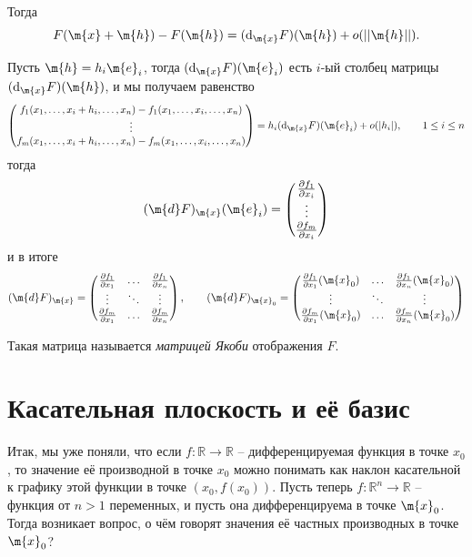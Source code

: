 Тогда 
\[
 F(\m{x} + \m{h}) - F(\m{h}) = (\mathrm{d}_\m{x}F)(\m{h}) + o(||\m{h}||).
\]

Пусть $\m{h} = h_i \m{e}_i$, тогда $(\mathrm{d}_\m{x}F)(\m{e}_i)$ есть $i$-ый столбец матрицы $(\mathrm{d}_\m{x}F)(\m{h})$, и мы получаем равенство
\[
 \begin{pmatrix}
     f_1(x_1, \ldots, x_i + h_i, \ldots, x_n) -f_1(x_1, \ldots, x_i, \ldots, x_n) \\
     \vdots \\
     f_m(x_1, \ldots, x_i + h_i, \ldots, x_n) -f_m(x_1, \ldots, x_i, \ldots, x_n)
 \end{pmatrix} = h_i(\mathrm{d}_\m{x}F)(\m{e}_i) + o(|h_i|), \qquad 1 \le i \le n
\]
тогда
\[
 (\m{d}F)_\m{x}(\m{e}_i) = \begin{pmatrix}
     \frac{\partial f_1}{\partial x_i} \\ \vdots \\ \frac{\partial f_m}{\partial x_i}
 \end{pmatrix}
\]
и в итоге
\[
 (\m{d}F)_\m{x} = \begin{pmatrix}
     \frac{\partial f_1}{\partial x_1} & \ldots & \frac{\partial f_1}{\partial x_n} \\
     \vdots & \ddots & \vdots \\
     \frac{\partial f_m}{\partial x_1} & \ldots & \frac{\partial f_m}{\partial x_n}
 \end{pmatrix}, \qquad 
 (\m{d}F)_{\m{x}_0} = \begin{pmatrix}
     \frac{\partial f_1}{\partial x_1}({\m{x}_0}) & \ldots & \frac{\partial f_1}{\partial x_n} ({\m{x}_0}) \\
     \vdots & \ddots & \vdots \\
     \frac{\partial f_m}{\partial x_1} ({\m{x}_0}) & \ldots & \frac{\partial f_m}{\partial x_n} ({\m{x}_0})
     \end{pmatrix}
    \]

Такая матрица называется \textit{матрицей Якоби} отображения $F.$


\section{Касательная плоскость и её базис}

Итак, мы уже поняли, что если $f:\mathbb{R} \to \mathbb{R}$ -- дифференцируемая функция в точке $x_0$, то значение её производной в точке $x_0$ можно понимать как наклон касательной к графику этой функции в точке $(x_0, f(x_0))$. Пусть теперь $f:\mathbb{R}^n \to \mathbb{R}$ -- функция от $n>1$ переменных, и пусть она дифференцируема в точке $\m{x}_0$. Тогда возникает вопрос, о чём говорят значения её частных производных в точке $\m{x}_0$?


